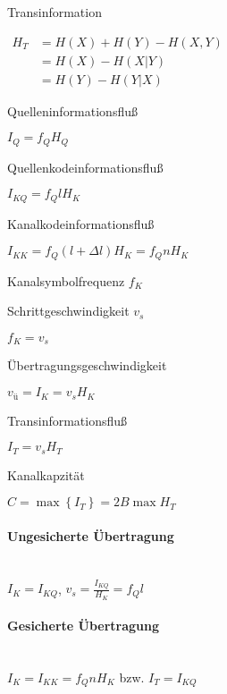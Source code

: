 \documentclass[8pt,a4paper,landscape]{extarticle}
\begin{document}
\begin{multicols*}{6}
Transinformation

$\begin{aligned}
	H_T	&= H(X) + H(Y) - H(X, Y) \\
		&= H(X)- H(X|Y) \\
		&= H(Y) - H(Y|X)
\end{aligned}$

Quelleninformationsfluß

$\boxed{I_Q = f_Q H_Q}$

Quellenkodeinformationsfluß

$\boxed{I_{KQ} = f_Q l H_K}$

Kanalkodeinformationsfluß

$\boxed{I_{KK} = f_Q (l + \Delta l) H_K = f_Q n H_K}$

Kanalsymbolfrequenz $f_K$

Schrittgeschwindigkeit $v_s$

$\boxed{f_K = v_s}$

Übertragungsgeschwindigkeit

$\boxed{v_{\text{ü}} = I_K = v_s H_K}$

Transinformationsfluß

$\boxed{I_T = v_s H_T}$

Kanalkapzität

$C = \max \left\lbrace I_T \right\rbrace = 2 B \max{H_T}$

\paragraph{Ungesicherte Übertragung} \hfill \\
$\boxed{I_K = I_{KQ}}$, $\boxed{v_s = \frac{I_{KQ}}{H_K} = f_Q l}$

\paragraph{Gesicherte Übertragung} \hfill \\
$\boxed{I_K = I_{KK} = f_Q n H_K}$ bzw. $\boxed{I_T = I_{KQ}}$


\end{multicols*}
\end{document}
